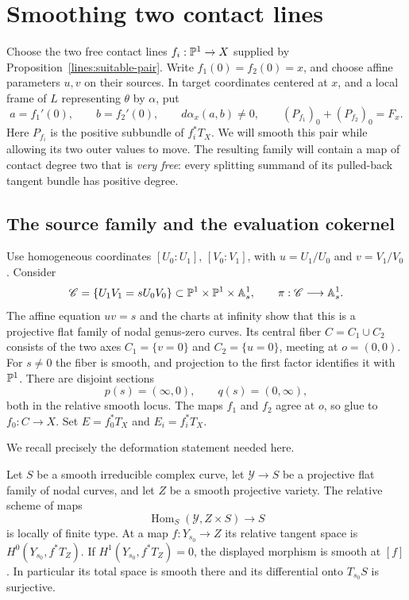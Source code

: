 \section{Smoothing two contact lines}
\label{sm:section}

Choose the two free contact lines
$f_i:\mathbb P^1\to X$ supplied by Proposition~\ref{lines:suitable-pair}.
Write $f_1(0)=f_2(0)=x$, and choose affine parameters $u,v$ on
their sources. In target coordinates centered at $x$, and a local
frame of $L$ representing $\theta$ by $\alpha$, put
\begin{equation}\label{sm:pair}
a=f_1'(0),\qquad b=f_2'(0),\qquad
d\alpha_x(a,b)\ne0,\qquad
(P_{f_1})_0+(P_{f_2})_0=F_x.
\end{equation}
Here $P_{f_i}$ is the positive subbundle of $f_i^*T_X$.
We will smooth this pair while allowing its two outer values to
move. The resulting family will contain a map of contact degree two
that is \emph{very free}: every splitting summand of its pulled-back
tangent bundle has positive degree.

\subsection{The source family and the evaluation cokernel}

Use homogeneous coordinates $[U_0:U_1]$, $[V_0:V_1]$, with
$u=U_1/U_0$ and $v=V_1/V_0$. Consider
\begin{equation}\label{sm:source}
\mathscr C=
\{U_1V_1=sU_0V_0\}
\subset\mathbb P^1\times\mathbb P^1\times\mathbb A^1_s,
\qquad \pi:\mathscr C\longrightarrow\mathbb A^1_s.
\end{equation}
The affine equation $uv=s$ and the charts at infinity show
that this is a projective flat family of nodal genus-zero curves.
Its central fiber $C=C_1\cup C_2$ consists of the two axes
$C_1=\{v=0\}$ and $C_2=\{u=0\}$, meeting at $o=(0,0)$.
For $s\ne0$ the fiber is smooth, and projection to the first
factor identifies it with $\mathbb P^1$. There are disjoint sections
\[
p(s)=(\infty,0),\qquad q(s)=(0,\infty),
\]
both in the relative smooth locus. The maps $f_1$ and $f_2$
agree at $o$, so glue to $f_0:C\to X$.
Set $E=f_0^*T_X$ and $E_i=f_i^*T_X$.

We recall precisely the deformation statement needed here.

\begin{lemma}\label{sm:relative-hom}
Let $S$ be a smooth irreducible complex curve, let
$\mathscr Y\to S$ be a projective flat family of nodal curves,
and let $Z$ be a smooth projective variety. The relative scheme
of maps
\[
\operatorname{Hom}_S(\mathscr Y,Z\times S)\longrightarrow S
\]
is locally of finite type. At a map $f:Y_{s_0}\to Z$ its
relative tangent space is $H^0(Y_{s_0},f^*T_Z)$.
If $H^1(Y_{s_0},f^*T_Z)=0$, the displayed morphism is smooth
at $[f]$. In particular its total space is smooth there and
its differential onto $T_{s_0}S$ is surjective.
\end{lemma}

